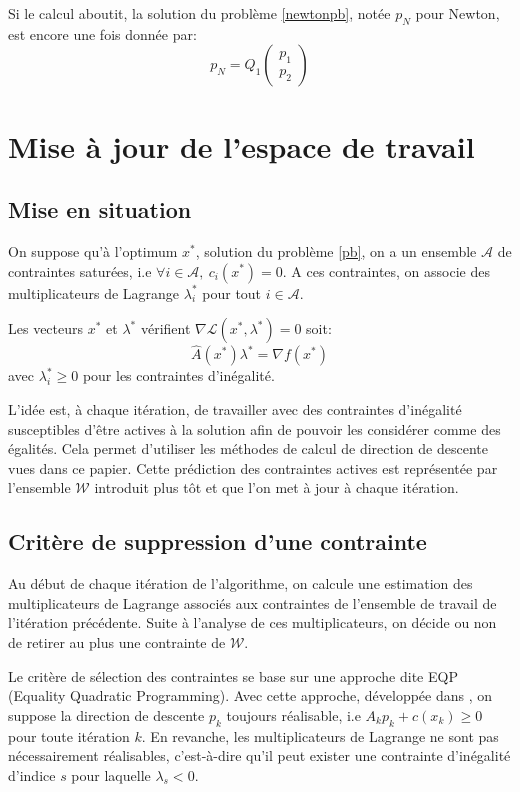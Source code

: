 \documentclass[a4paper,11pt]{article}
\newcommand{\ha}{\hat{A}}
\numberwithin{equation}{section}
\begin{document}
Si le calcul aboutit, la solution du problème \ref{newtonpb}, notée $p_{N}$ pour Newton, est encore une fois donnée par:
$$ p_{N} = Q_{1}\begin{pmatrix}p_{1}\\ p_{2} \end{pmatrix}$$


\section{Mise à jour de l'espace de travail} \label{working-set}

\subsection{Mise en situation}

On suppose qu'à l'optimum $x^{*}$, solution du problème \ref{pb}, on a 
un ensemble $\mathcal{A}$ de contraintes saturées, i.e $\forall i \in \mathcal{A},\ c_{i}(x^{*}) = 0$. A ces contraintes, on associe des multiplicateurs de Lagrange $\lambda^{*}_{i}$ pour tout $i\in \mathcal{A}$. 

Les vecteurs $x^{*}$ et $\lambda^{*}$ vérifient $\nabla \mathcal{L}(x^{*},\lambda^{*}) = 0$ soit:
\begin{equation} 
\ha(x^{*})\lambda^{*}=\nabla f(x^{*})
\end{equation}
avec $\lambda_{i}^{*}\geq0$ pour les contraintes d'inégalité. 

L'idée est, à chaque itération, de travailler avec des contraintes d'inégalité susceptibles d'être actives à la solution afin de pouvoir les considérer comme des égalités. Cela permet d'utiliser les méthodes de calcul de direction de descente vues dans ce papier. Cette prédiction des contraintes actives est représentée par l'ensemble $\mathcal{W}$ introduit plus tôt et que l'on met à jour à chaque itération. 

\subsection{Critère de suppression d'une contrainte} \label{criteresupr}

Au début de chaque itération de l'algorithme, on calcule une estimation des multiplicateurs de Lagrange associés aux contraintes de l'ensemble de travail de l'itération précédente. Suite à l'analyse de ces multiplicateurs, on décide ou non de retirer au plus une contrainte de $\mathcal{W}$.

Le critère de sélection des contraintes se base sur une approche dite EQP (Equality Quadratic Programming). Avec cette approche, développée dans \cite{gillmurray1985}, on suppose la direction de descente $p_{k}$ toujours réalisable, i.e $A_{k}p_{k} + c(x_{k}) \geq 0$ pour toute itération $k$. En revanche, les multiplicateurs de Lagrange ne sont pas nécessairement réalisables, c'est-à-dire qu'il peut exister une contrainte d'inégalité d'indice $s$ pour laquelle $\lambda_{s}<0$.  
\end{document}
